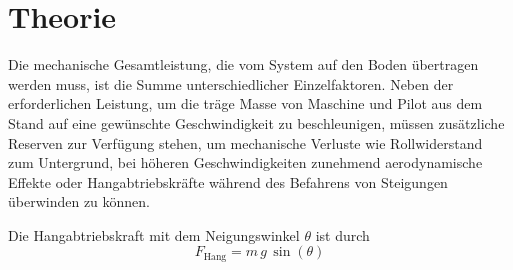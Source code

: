 \chapter{Theorie}\label{sec:theory}
%
%
%
%
%
%
%
%
%
%
%
%
%
%
%
%
%
%
%
%
%
%
	Die mechanische Gesamtleistung, die vom System auf den Boden übertragen werden muss, ist die Summe unterschiedlicher Einzelfaktoren.
	Neben der erforderlichen Leistung, um die träge Masse von Maschine und Pilot aus dem Stand auf eine gewünschte Geschwindigkeit zu beschleunigen, müssen zusätzliche Reserven zur Verfügung stehen, um mechanische Verluste wie Rollwiderstand zum Untergrund, bei höheren Geschwindigkeiten zunehmend aerodynamische Effekte oder Hangabtriebskräfte während des Befahrens von Steigungen überwinden zu können.\par\medskip
	Die Hangabtriebskraft mit dem Neigungswinkel \(\theta\) ist durch
	\begin{equation}
		F_\text{Hang} = m \, g \, \sin\!\left(\theta\right)%
		\label{eq:downhill force}
	\end{equation}%
	
